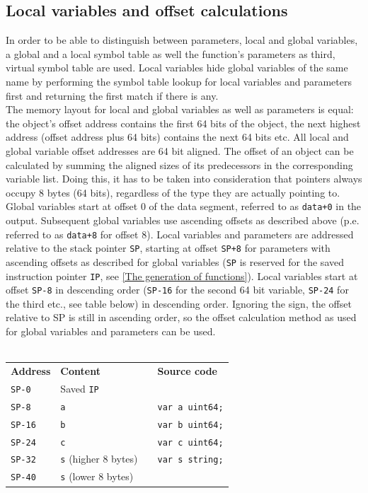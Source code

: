\documentclass[a4paper]{scrartcl}
\let\section\subsection
\let\subsection\subsubsection
\let\subsubsection\paragraph
\let\paragraph\subparagraph
\let\subparagraph\undefined
\begin{document}
    \section{Local variables and offset calculations}
      In order to be able to distinguish between parameters, local and global variables, a global and a local symbol table as well the function's parameters as third, virtual symbol table are used. Local variables hide global variables of the same name by performing the symbol table lookup for local variables and parameters first and returning the first match if there is any.\\
      The memory layout for local and global variables as well as parameters is equal: the object's offset address contains the first 64 bits of the object, the next highest address (offset address plus 64 bits) contains the next 64 bits etc. All local and global variable offset addresses are 64 bit aligned. The offset of an object can be calculated by summing the aligned sizes of its predecessors in the corresponding variable list. Doing this, it has to be taken into consideration that pointers always occupy 8 bytes (64 bits), regardless of the type they are actually pointing to.\\
      Global variables start at offset 0 of the data segment, referred to as \texttt{data+0} in the output. Subsequent global variables use ascending offsets as described above (p.e. referred to as \texttt{data+8} for offset 8). Local variables and parameters are addressed relative to the stack pointer \texttt{SP}, starting at offset \texttt{SP+8} for parameters with ascending offsets as described for global variables (\texttt{SP} is reserved for the saved instruction pointer \texttt{IP}, see \ref{The generation of functions}). Local variables start at offset \texttt{SP-8} in descending order (\texttt{SP-16} for the second 64 bit variable, \texttt{SP-24} for the third etc., see table below) in descending order. Ignoring the sign, the offset relative to SP is still in ascending order, so the offset calculation method as used for global variables and parameters can be used.\\ \\
      \begin{table}
      \begin{tabular}{llp{2cm}l}
        \cmidrule{1-2}
        \textbf{Address} & \textbf{Content} & & \textbf{Source code}\\
        \cmidrule{1-2}
        \texttt{SP-0} & Saved \texttt{IP} & & \\
        \texttt{SP-8} & \texttt{a} & & \texttt{var a uint64;}\\
        \texttt{SP-16} & \texttt{b} & & \texttt{var b uint64;}\\
        \texttt{SP-24} & \texttt{c} & & \texttt{var c uint64;}\\
        \texttt{SP-32} & \texttt{s} (higher 8 bytes) & & \texttt{var s string;}\\
        \texttt{SP-40} & \texttt{s} (lower 8 bytes) & & \\
        \cmidrule{1-2}
      \end{tabular}
      \end{table}\\ \\
\end{document}
